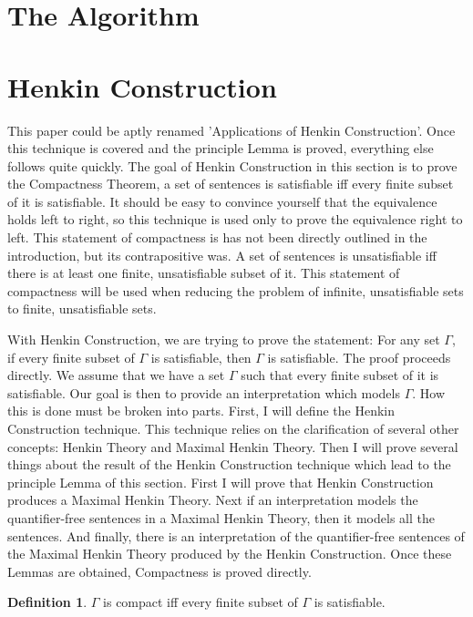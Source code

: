 \documentclass[12pt]{article}
\theoremstyle{definition}
\newtheorem{definition}[theorem]{Definition}
\theoremstyle{remark}
\begin{document}
\section{The Algorithm}

\section{Henkin Construction}

This paper could be aptly renamed 'Applications of Henkin Construction'. Once this technique is covered and the principle Lemma is proved, everything else follows quite quickly. The goal of Henkin Construction in this section is to prove the Compactness Theorem, a set of sentences is satisfiable iff every finite subset of it is satisfiable. It should be easy to convince yourself that the equivalence holds left to right, so this technique is used only to prove the equivalence right to left. This statement of compactness is has not been directly outlined in the introduction, but its contrapositive was. A set of sentences is unsatisfiable iff there is at least one finite, unsatisfiable subset of it. This statement of compactness will be used when reducing the problem of infinite, unsatisfiable sets to finite, unsatisfiable sets.

With Henkin Construction, we are trying to prove the statement: For any set $\Gamma$, if every finite subset of $\Gamma$ is satisfiable, then $\Gamma$ is satisfiable. The proof proceeds directly. We assume that we have a set $\Gamma$ such that every finite subset of it is satisfiable. Our goal is then to provide an interpretation which models $\Gamma$. How this is done must be broken into parts. First, I will define the Henkin Construction technique. This technique relies on the clarification of several other concepts: Henkin Theory and Maximal Henkin Theory. Then I will prove several things about the result of the Henkin Construction technique which lead to the principle Lemma of this section. First I will prove that Henkin Construction produces a Maximal Henkin Theory. Next if an interpretation models the quantifier-free sentences in a Maximal Henkin Theory, then it models all the sentences. And finally, there is an interpretation of the quantifier-free sentences of the Maximal Henkin Theory produced by the Henkin Construction. Once these Lemmas are obtained, Compactness is proved directly. 

\begin{definition}
	$\Gamma$ is compact iff every finite subset of $\Gamma$ is satisfiable.
\end{definition}
\end{document}
